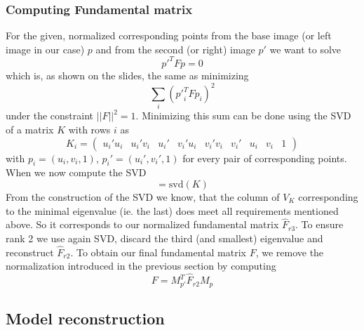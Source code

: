 \documentclass{paper}
\begin{document}
\subsubsection{Computing Fundamental matrix}
For the given, normalized corresponding points from the base image (or left image in our case) $p$ and from the second (or right) image $p'$ 
we want to solve 
\begin{equation}
	p'^T F p = 0
\end{equation}
which is, as shown on the slides, the same as minimizing
\begin{equation}
	\sum_i ({p'}_i^T F p_i)^2
\end{equation}
under the constraint $||F||^2 = 1$. Minimizing this sum can be done using the SVD of a matrix $K$ with rows $i$ as
\begin{equation}
K_i = 
\begin{pmatrix}
 u_i'u_i & u_i'v_i & u_i' & v_i'u_i & v_i'v_i & v_i' & u_i & v_i & 1 
\end{pmatrix}
\end{equation}
with $p_i = (u_i,v_i,1)$, $p_i' = (u_i',v_i',1)$ for every pair of corresponding points. When we now compute the SVD
\begin{equation}
	[U_K, D_K, V_K] = \text{svd}(K)
\end{equation}
From the construction of the SVD we know, that the column of $V_K$ corresponding to the minimal eigenvalue (ie. the last) does meet all
requirements mentioned above. So it corresponds to our normalized
fundamental matrix $\hat{F}_{r3}$. To ensure rank 2 we use again SVD, 
discard the third (and smallest) eigenvalue and reconstruct $\hat{F}_{r2}$. 
To obtain our final fundamental matrix $F$, we remove the normalization introduced in the previous section by computing 
   \begin{equation}
   F = M_{p'}^ T \hat{F}_{r2} M_p
   \end{equation}
\subsection{Model reconstruction}


\end{document}
